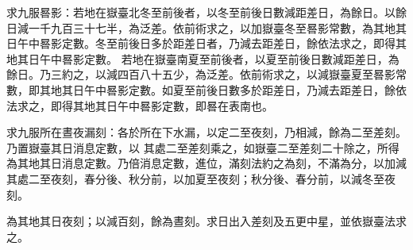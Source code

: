\begin{pinyinscope}
 求九服晷影：若地在嶽臺北冬至前後者，以冬至前後日數減距差日，為餘日。以餘日減一千九百三十七半，為泛差。依前術求之，以加嶽臺冬至晷影常數，為其地其日午中晷影定數。冬至前後日多於距差日者，乃減去距差日，餘依法求之，即得其地其日午中晷影定數。
 若地在嶽臺南夏至前後者，以夏至前後日數減距差日，為餘日。乃三約之，以減四百八十五少，為泛差。依前術求之，以減嶽臺夏至晷影常數，即其地其日午中晷影定數。如夏至前後日數多於距差日，乃減去距差日，餘依法求之，即得其地其日午中晷影定數，即晷在表南也。



 求九服所在晝夜漏刻：各於所在下水漏，以定二至夜刻，乃相減，餘為二至差刻。乃置嶽臺其日消息定數，以
 其處二至差刻乘之，如嶽臺二至差刻二十除之，所得為其地其日消息定數。乃倍消息定數，進位，滿刻法約之為刻，不滿為分，以加減其處二至夜刻，春分後、秋分前，以加夏至夜刻；秋分後、春分前，以減冬至夜刻。



 為其地其日夜刻；以減百刻，餘為晝刻。求日出入差刻及五更中星，並依嶽臺法求之。



\end{pinyinscope}